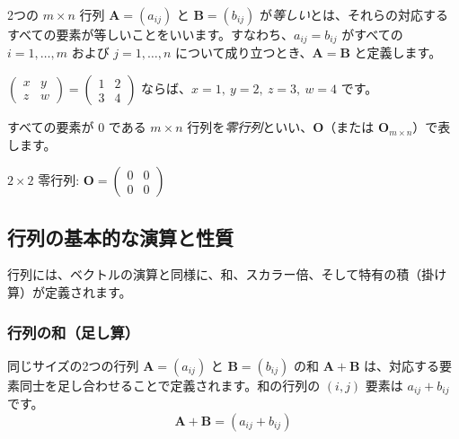 \begin{dfn}[行列の等しさ] \label{matrix_equality}
2つの $m \times n$ 行列 $\bm{A} = (a_{ij})$ と $\bm{B} = (b_{ij})$ が\emph{等しい}とは、それらの対応するすべての要素が等しいことをいいます。すなわち、$a_{ij} = b_{ij}$ がすべての $i=1, \ldots, m$ および $j=1, \ldots, n$ について成り立つとき、$\bm{A} = \bm{B}$ と定義します。
\end{dfn}

\begin{ex}
$\begin{pmatrix} x & y \\ z & w \end{pmatrix} = \begin{pmatrix} 1 & 2 \\ 3 & 4 \end{pmatrix}$ ならば、$x=1,\ y=2,\ z=3,\ w=4$ です。
\end{ex}

\begin{dfn}[零行列] \label{zero_matrix}
すべての要素が $0$ である $m \times n$ 行列を\emph{零行列}といい、$\bm{O}$（または $\bm{O}_{m \times n}$）で表します。
\end{dfn}

\begin{ex}
$2 \times 2$ 零行列: $\bm{O} = \begin{pmatrix} 0 & 0 \\ 0 & 0 \end{pmatrix}$
\end{ex}

\subsection{行列の基本的な演算と性質}

行列には、ベクトルの演算と同様に、和、スカラー倍、そして特有の積（掛け算）が定義されます。

\subsubsection{行列の和（足し算）}

\begin{dfn}[行列の和] \label{matrix_sum}
同じサイズの2つの行列 $\bm{A} = (a_{ij})$ と $\bm{B} = (b_{ij})$ の和 $\bm{A} + \bm{B}$ は、対応する要素同士を足し合わせることで定義されます。和の行列の $(i,j)$ 要素は $a_{ij} + b_{ij}$ です。
\[\bm{A} + \bm{B} = (a_{ij} + b_{ij})\]
\end{dfn}

